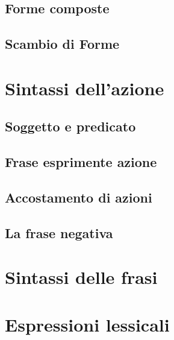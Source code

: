 \documentclass[11pt,a4paper]{amsart}
\begin{document}
\subsection{Forme composte}
\subsection{Scambio di Forme}
\section{Sintassi dell'azione}
\subsection{Soggetto e predicato}
\subsection{Frase esprimente azione}
\subsection{Accostamento di azioni}
\subsection{La frase negativa}
\section{Sintassi delle frasi}
\section{Espressioni lessicali}

\nocite{*}


\end{document}
